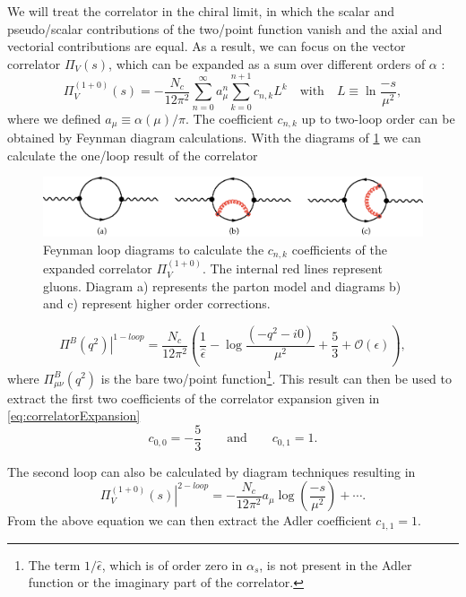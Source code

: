 \documentclass[../../index.tex]{subfiles}
\begin{document}
We will treat the correlator in the chiral limit, in which the scalar and
pseudo\-/scalar contributions of the two\-/point function vanish and the axial
and vectorial contributions are equal. As a result, we can focus on the vector
correlator \(\Pi_V(s)\), which can be expanded as a sum over different orders of
\(\alpha\) \cite{Beneke2008}:
\begin{equation}
  \label{eq:correlatorExpansion}
  \Pi_V^{(1+0)}(s) = - \frac{N_c}{12 \pi^2} \sum_{n=0}^\infty a_\mu^n \sum_{k=0}^{n+1} c_{n,k} L^{k} \quad \text{with} \quad L \equiv \ln \frac{-s}{\mu^2},
\end{equation}
where we defined \(a_\mu \equiv \alpha(\mu)/ \pi\). The coefficient \(c_{n,k}\)
up to two-loop order can be obtained by Feynman diagram calculations. With the
diagrams of \cref{fig:perturbativeContributionFeynmanDiagrams} we can calculate
the one\-/loop result of the correlator \cite{Jamin2006}
\begin{figure}
  \centering
  \includegraphics[width=\textwidth]{./images/correlatorLoopDiagrams.eps}
  \caption{Feynman loop diagrams to calculate the \(c_{n,k}\) coefficients of
    the expanded correlator \(\Pi_V^{(1+0)}\). The internal red lines represent
    gluons. Diagram a) represents the parton model and diagrams b) and c)
    represent higher order corrections.}
  \label{fig:perturbativeContributionFeynmanDiagrams}
\end{figure}
\begin{equation}
  \left. \Pi^B(q^2) \right\rvert^{1-loop} = \frac{N_c}{12\pi^2} \left( \frac{1}{\hat \epsilon} - \log\frac{(-q^2 - i0)}{\mu^2} + \frac{5}{3} + \mathcal{O}(\epsilon) \right),
\end{equation}
where \(\Pi^B_{\mu\nu}(q^2)\) is the bare two\-/point function\footnote{The term
  \(1/ \hat \epsilon\), which is of order zero in \(\alpha_s\), is not present
  in the Adler function or the imaginary part of the correlator.}. This result
can then be used to extract the first two coefficients of the correlator
expansion given in \cref{eq:correlatorExpansion}
\begin{equation}
  c_{0,0} = - \frac{5}{3} \qquad \text{and} \qquad c_{0,1} = 1.
\end{equation}

The second loop can also be calculated by diagram techniques resulting in
\cite{Boito2011}
\begin{equation}
  \left. \Pi_V^{(1+0)}(s) \right\rvert^{2-loop} = -\frac{N_c}{12\pi^2} a_\mu \log(\frac{-s}{\mu^2}) + \cdots.
\end{equation}
From the above equation we can then extract the Adler coefficient \(c_{1,1} =
1\).
\end{document}
